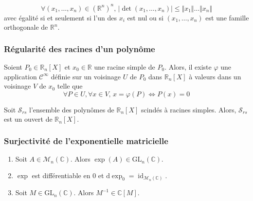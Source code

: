   \begin{application}
    \[ \forall (x_1, \dots, x_n) \in (\mathbb{R}^n)^n, \, \vert \det(x_1, \dots, x_n) \vert \leq \Vert x_1 \Vert \dots \Vert x_n \Vert \]
    avec égalité si et seulement si l'un des $x_i$ est nul ou si $(x_1, \dots, x_n)$ est une famille orthogonale de $\mathbb{R}^n$.
  \end{application}

  \subsubsection{Régularité des racines d'un polynôme}


  \begin{proposition}
    Soient $P_0 \in \mathbb{R}_n[X]$ et $x_0 \in \mathbb{R}$ une racine simple de $P_0$. Alors, il existe $\varphi$ une application $\mathcal{C}^\infty$ définie sur un voisinage $U$ de $P_0$ dans $\mathbb{R}_n[X]$ à valeurs dans un voisinage $V$ de $x_0$ telle que
    \[ \forall P \in U, \forall x \in V, \, x = \varphi(P) \iff P(x) = 0 \]
  \end{proposition}

  \begin{application}
    Soit $\mathcal{S}_{rs}$ l'ensemble des polynômes de $\mathbb{R}_n[X]$ scindés à racines simples. Alors, $\mathcal{S}_{rs}$ est un ouvert de $\mathbb{R}_n[X]$.
  \end{application}

  \subsubsection{Surjectivité de l'exponentielle matricielle}


  \begin{lemma}
    \begin{enumerate}[label={\bfseries(\roman*)}]
      \item Soit $A \in \mathcal{M}_n(\mathbb{C})$. Alors $\exp(A) \in \mathrm{GL}_n(\mathbb{C})$.
      \item $\exp$ est différentiable en $0$ et $\mathrm{d}\exp_0 = \operatorname{id}_{\mathcal{M}_n(\mathbb{C})}$.
      \item Soit $M \in \mathrm{GL}_n(\mathbb{C})$. Alors $M^{-1} \in \mathbb{C}[M]$.
    \end{enumerate}
  \end{lemma}

